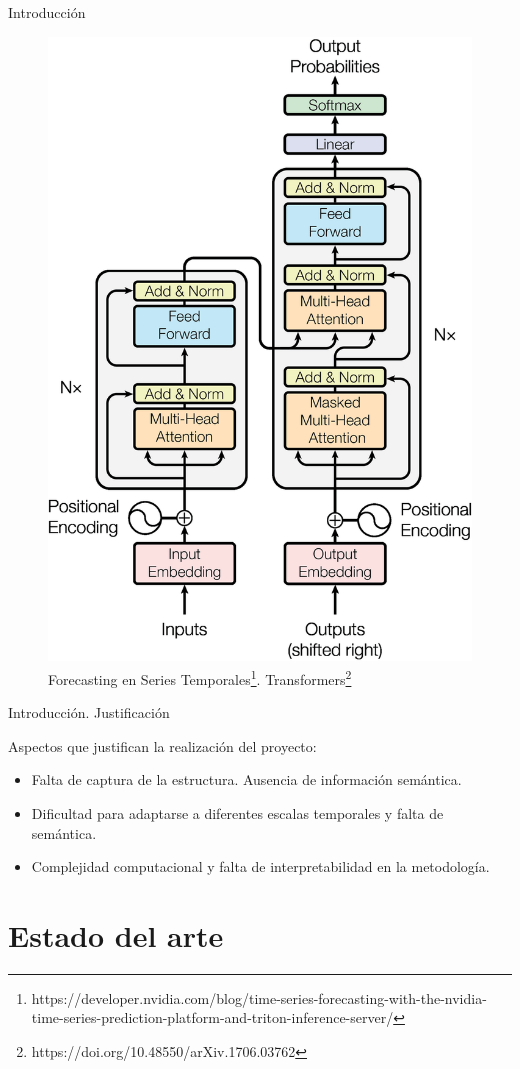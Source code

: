 \documentclass[compress]{beamer}
\begin{document}
\begin{frame}{Introducción}
\begin{figure}
\begin{minipage}{0.4\textwidth}
				\includegraphics[height=\columnwidth]{pic/trans.png}
			\end{minipage}
			\caption[]{Forecasting en Series Temporales\footnote{{https://developer.nvidia.com/blog/time-series-forecasting-with-the-nvidia-time-series-prediction-platform-and-triton-inference-server/}}. Transformers\footnote{
					https://doi.org/10.48550/arXiv.1706.03762}}
		\end{figure}
	\end{frame}
	
	\begin{frame}{Introducción. Justificación}
		
		Aspectos que justifican la realización del proyecto:
		\begin{itemize}
			\item Falta de captura de la estructura. Ausencia de información semántica.
			\item Dificultad para adaptarse a diferentes escalas temporales y falta de semántica.
			\item Complejidad computacional y falta de interpretabilidad en la metodología.
		\end{itemize}
	\end{frame}
	
	\section{Estado del arte}
	
\end{document}

